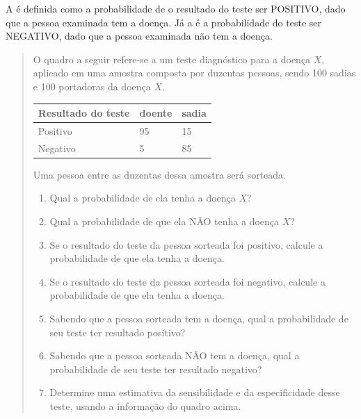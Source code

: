 A  é definida como a probabilidade de o resultado do teste ser POSITIVO, dado que a pessoa examinada tem a doença. Já a  é a probabilidade do teste ser NEGATIVO, dado que a pessoa examinada não tem a doença.
\begin{quote}

O quadro a seguir refere-se a um teste diagnóstico para a doença \(X\), aplicado em uma amostra composta por duzentas pessoas, sendo 100 sadias e 100 portadoras da doença \(X\).


\begin{savenotes}\sphinxattablestart
\centering
\begin{tabulary}{\linewidth}[t]{|T|T|T|}
\hline

Resultado
do teste
&
doente
&
sadia
\\
\hline
Positivo
&
95
&
15
\\
\hline
Negativo
&
5
&
85
\\
\hline
\end{tabulary}
\par
\sphinxattableend\end{savenotes}

Uma pessoa entre as duzentas dessa amostra será sorteada.
\begin{enumerate}
\item {} 
Qual a probabilidade de ela tenha a doença \(X\)?

\item {} 
Qual a probabilidade de que ela NÃO tenha a doença \(X\)?

\item {} 
Se o resultado do teste da pessoa sorteada foi positivo, calcule a probabilidade de que ela tenha a doença.

\item {} 
Se o resultado do teste da pessoa sorteada foi negativo, calcule a probabilidade de que ela tenha a doença.

\item {} 
Sabendo que a pessoa sorteada tem a doença, qual a probabilidade de seu teste ter resultado positivo?

\item {} 
Sabendo que a pessoa sorteada  NÃO tem a doença, qual a probabilidade de seu teste ter resultado negativo?

\item {} 
Determine uma estimativa da sensibilidade e da especificidade desse teste, usando a informação do quadro acima.

\end{enumerate}
\end{quote}
